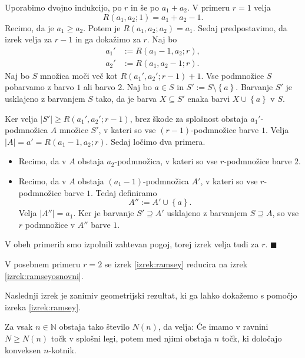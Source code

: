 \documentclass[twoside,11pt]{article}
\providecommand{\set}[1]{\left\{#1\right\}}
\providecommand{\abs}[1]{\left\lvert #1\right\rvert}
\begin{document}
\begin{dokaz}
    Uporabimo dvojno indukcijo, po $r$ in še po $a_1 + a_2$. 
    V primeru $r = 1$ velja \[R(a_1, a_2; 1) = a_1 + a_2 -1.\] Recimo, da je $a_1 \ge a_2$. Potem je 
    $R(a_1, a_2; a_2) = a_1$. Sedaj predpostavimo, da izrek velja za $r-1$ in ga dokažimo za $r$.
    Naj bo
    \begin{align*}
        a_1' &:= R(a_1 - 1, a_2; r), \\
        a_2' &:= R(a_1, a_2 -1; r).
    \end{align*}
    Naj bo $S$ množica moči več kot $R(a_1', a_2'; r-1) + 1$. Vse podmnožice $S$ pobarvamo z 
    barvo $1$ ali barvo $2$. Naj bo $a \in S$ in $S' := S \setminus \set{a}$. Barvanje $S'$ je 
    usklajeno z barvanjem $S$ tako, da je barva $X \subseteq S'$ enaka barvi $X \cup \set{a}$ v $S$.

    Ker velja $\abs{S'} \ge R(a_1', a_2';r-1)$, brez škode za splošnost obstaja $a_1'$-podmnožica $A$ 
    množice $S'$, v kateri so vse $(r-1)$-podmnožice barve $1$. Velja $\abs{A} = a' = R(a_1-1,a_2;r)$.
    Sedaj ločimo dva primera.
    \begin{itemize}
        \item Recimo, da v $A$ obstaja $a_2$-podmnožica, v kateri so vse $r$-podmnožice barve $2$.
        \item Recimo, da v $A$ obstaja $(a_1-1)$-podmnožica $A'$, v kateri so vse $r$-podmnožice barve $1$. 
        Tedaj definiramo
        \[
            A'' := A' \cup \set{a}.
        \]
        Velja $\abs{A''} = a_1$. Ker je barvanje $S' \supseteq A'$ usklajeno z barvanjem $S \supseteq A$, 
        so vse $r$ podmnožice v $A''$ barve $1$.
    \end{itemize}
    V obeh primerih smo izpolnili zahtevan pogoj, torej izrek velja tudi za $r$. \hfill $\blacksquare$
\end{dokaz}

V posebnem primeru $r = 2$ se izrek \ref{izrek:ramsey} reducira 
na izrek \ref{izrek:ramseyosnovni}.

Naslednji izrek je zanimiv geometrijski rezultat, ki ga lahko dokažemo 
s pomočjo izreka \ref{izrek:ramsey}.

\begin{izrek} \label{izrek:happyend}
    Za vsak $n \in \mathbb{N}$ obstaja tako število $N(n)$, da velja: Če imamo v ravnini $N \ge N(n)$
    točk v splošni legi, potem med njimi obstaja $n$ točk, ki določajo konveksen $n$-kotnik.
\end{izrek}
\end{document}
